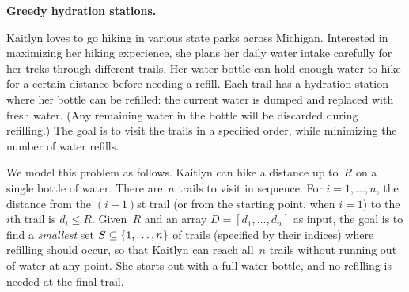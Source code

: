 \documentclass[11pt,addpoints,answers]{exam}
\begin{document}
\begin{questions}
\begin{parts}
    
\end{parts}

 \question \textbf{Greedy hydration stations.}
 
 Kaitlyn loves to go hiking in various state parks across Michigan.
Interested in maximizing her hiking experience, she plans her daily water intake carefully for her treks through different trails.
Her water bottle can hold enough water to hike for a certain distance before needing a refill.
Each trail has a hydration station where her bottle can be refilled: the current water is dumped and replaced with fresh water.
(Any remaining water in the bottle will be discarded during refilling.)
The goal is to visit the trails in a specified order, while minimizing the number of water refills.

We model this problem as follows.
Kaitlyn can hike a distance up to~$R$ on a single bottle of water.
There are~$n$ trails to visit in sequence.
For $i=1, \ldots, n$, the distance from the $(i-1)$st trail (or from the starting point, when $i=1$) to the $i$th trail is $d_i \leq R$.
Given~$R$ and an array $D = [d_1, \ldots, d_n]$ as input, the goal is to find a \emph{smallest} set $S \subseteq \{1,\ldots,n\}$ of trails (specified by their indices) where refilling should occur, so that Kaitlyn can reach all~$n$ trails without running out of water at any point.
She starts out with a full water bottle, and no refilling is needed at the final trail.

\end{questions}
\end{document}
